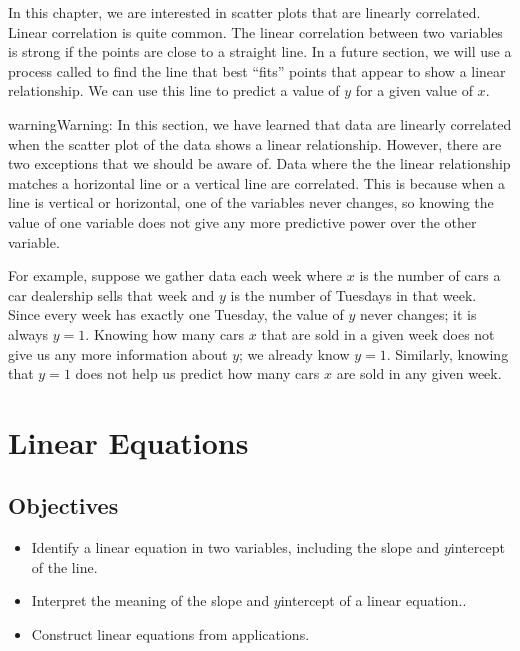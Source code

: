 \documentclass[letterpaper,10pt,english]{jupyterBook}
\begin{document}
\sphinxAtStartPar
In this chapter, we are interested in scatter plots that are linearly correlated. Linear correlation is quite common. The linear correlation between two variables is strong if the points are close to a straight line. In a future section, we will use a process called  to find the line that best “fits” points that appear to show a linear relationship. We can use this line to predict a value of \(y\) for a given value of \(x\).

\begin{sphinxadmonition}{warning}{Warning:}
\sphinxAtStartPar
In this section, we have learned that data are linearly correlated when the scatter plot of the data shows a linear relationship. However, there are two exceptions that we should be aware of. Data where the the linear relationship matches a horizontal line or a vertical line are  correlated. This is because when a line is vertical or horizontal, one of the variables never changes, so knowing the value of one variable does not give any more predictive power over the other variable.

\sphinxAtStartPar
For example, suppose we gather data each week where \(x\) is the number of cars a car dealership sells that week and \(y\) is the number of Tuesdays in that week. Since every week has exactly one Tuesday, the value of \(y\) never changes; it is always \(y = 1\). Knowing how many cars \(x\) that are sold in a given week  does not give us any more information about \(y\); we already know \(y = 1\). Similarly, knowing that \(y = 1\) does not help us predict how many cars \(x\) are sold in any given week.
\end{sphinxadmonition}

\sphinxstepscope


\section{Linear Equations}
\label{\detokenize{Ch8 Correlation and Linear Regression/8.2 Linear Equations:linear-equations}}\label{\detokenize{Ch8 Correlation and Linear Regression/8.2 Linear Equations::doc}}

\subsection{Objectives}
\label{\detokenize{Ch8 Correlation and Linear Regression/8.2 Linear Equations:objectives}}\begin{itemize}
\item {} 
\sphinxAtStartPar
Identify a linear equation in two variables, including the slope and \(y\)\sphinxhyphen{}intercept of the line.

\item {} 
\sphinxAtStartPar
Interpret the meaning of the slope and \(y\)\sphinxhyphen{}intercept of a linear equation..

\item {} 
\sphinxAtStartPar
Construct linear equations from applications.

\end{itemize}
\end{document}
